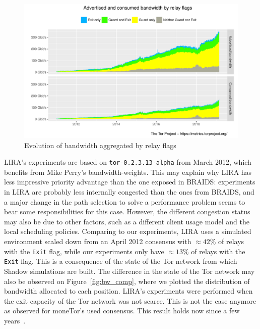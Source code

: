 \begin{figure}
  \includegraphics[scale=0.415]{images/bandwidth-flags-2011-01-01-2019-02-25.pdf}
  \caption{Evolution of bandwidth aggregated by relay
    flags} \label{fig:bw_inequalities}
\end{figure}

LIRA's experiments are based on \texttt{tor-0.2.3.13-alpha} from March 2012, which benefits from Mike Perry's bandwidth-weights.
This may explain why LIRA has less impressive priority advantage than the one exposed in BRAIDS: experiments in LIRA are probably less internally congested than the ones from BRAIDS, and a major change in the path selection to solve a performance problem seems to bear some responsibilities for this case.
However, the different congestion status may also be due to other factors, such as a different client usage model and the local scheduling policies.
Comparing to our experiments, LIRA uses a simulated environment scaled down from an April 2012 consensus with $\approx 42\%$ of relays with the \texttt{Exit} flag, while our experiments only have $\approx 13\%$ of relays with the \texttt{Exit} flag.
This is a consequence of the state of the Tor network from which Shadow simulations are built.
The difference in the state of the Tor network may also be observed on Figure~\ref{fig:bw_comp}, where we plotted the distribution of bandwidth allocated to each position.
LIRA's experiments were performed when the exit capacity of the Tor network was not scarce.
This is not the case anymore as observed for moneTor's used consensus.
This result holds now since a few years~\cite{waterfilling-pets2017}.

